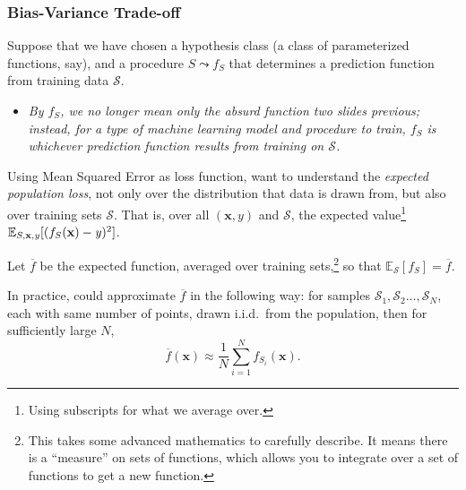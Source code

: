 \documentclass[smaller]{beamer}
\theoremstyle{example}
\newcommand{\x}{\textbf{x}}
\newcommand{\ix}[1]{{\it #1}}
\begin{document}
\begin{frame}
    \frametitle{Bias-Variance Trade-off}
    Suppose that we have chosen a hypothesis class (a class of parameterized functions, say), and a procedure $S \leadsto f_S$ that determines a prediction function from training data $\mathcal S$. 
    \begin{itemize}
        \item \textit{By $f_S$, we no longer mean only the absurd function two slides previous; instead, for a type of machine learning model and procedure to train, $f_S$ is whichever prediction function results from training on $\mathcal S$.}
    \end{itemize}

    Using Mean Squared Error as loss function, want to understand the \textit{expected population loss}, not only over the distribution that data is drawn from, but also over training sets $\mathcal S$. That is, over all $(\x, y)$ and $\mathcal S$, the expected value\footnote{Using subscripts for what we average over.} $\mathbb E_{S, \x, \ix y}[(f_S(\x) - \ix y)^2]$.

    \pause
    Let $\overline{f}$ be the expected function, averaged over training sets,\footnote{This takes some advanced mathematics to carefully describe. It means there is a ``measure'' on sets of functions, which allows you to integrate over a set of functions to get a new function.} so that $\mathbb E_{\mathcal S}[f_S] = \overline{f}$. 
    
    \pause
    In practice, could approximate $\overline{f}$ in the following way: for samples $\mathcal S_1, \mathcal S_2\ldots,\mathcal S_N$, each with same number of points, drawn i.i.d.\ from the population, then for sufficiently large $N$, 
        \[\overline{f}(\x) \approx \frac{1}{N}\sum_{i=1}^Nf_{S_i}(\x).\]
\end{frame}
\end{document}
